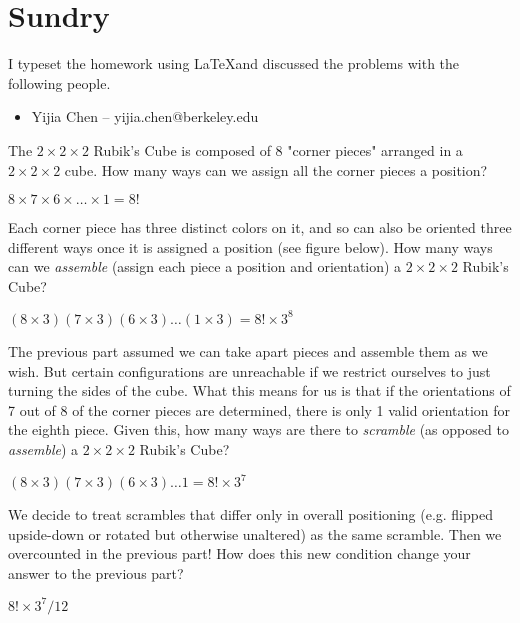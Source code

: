 \documentclass[11pt]{article}
\begin{document}
\section*{Sundry}

\begin{Answer}
    I typeset the homework using \LaTeX and discussed the problems with the following people.
    \begin{itemize}
        \item Yijia Chen -- yijia.chen@berkeley.edu
    \end{itemize}
\end{Answer}

\newpage
{}

\begin{Parts}
    \Part The $2\times2\times2$ Rubik's Cube is composed of 8 "corner pieces" arranged in a 
    $2\times2\times2$ cube. How many ways can we assign all the corner pieces a position?
    \begin{Answer}
        $8 \times 7 \times 6 \times \ldots \times 1 = 8!$
    \end{Answer}

    \Part Each corner piece has three distinct colors on it, and so can also be oriented three 
    different ways once it is assigned a position (see figure below). How many ways can we 
    \emph{assemble} (assign each piece a position and orientation) a $2\times2\times2$ Rubik's Cube?
    \begin{Answer}
        $(8 \times 3)(7 \times 3)(6 \times 3)\ldots(1 \times 3) = 8! \times 3^8$
    \end{Answer}

    \Part The previous part assumed we can take apart pieces and assemble them as we wish. 
    But certain configurations are unreachable if we restrict ourselves to just turning the 
    sides of the cube. What this means for us is that if the orientations of 7 out of 8 of the corner 
    pieces are determined, there is only 1 valid orientation for the eighth piece. Given this, how 
    many ways are there to \emph{scramble} (as opposed to \emph{assemble}) a $2\times2\times2$ Rubik's Cube?
    \begin{Answer}
        $(8 \times 3)(7 \times 3)(6 \times 3)\ldots 1 = 8! \times 3^7$
    \end{Answer}

    \Part We decide to treat scrambles that differ only in overall positioning (e.g. flipped 
    upside-down or rotated but otherwise unaltered) as the same scramble. Then we overcounted 
    in the previous part! How does this new condition change your answer to the previous part?
    \begin{Answer}
        $8! \times 3^7 / 12$
    \end{Answer}


\end{Parts}
\end{document}
